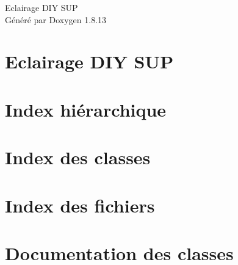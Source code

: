 \documentclass[twoside]{book}
\newcommand{\+}{\discretionary{\mbox{\scriptsize$\hookleftarrow$}}{}{}}
\newcommand{\clearemptydoublepage}{%
  \newpage{\pagestyle{empty}\cleardoublepage}%
}
\begin{document}
\hypersetup{pageanchor=false,
             bookmarksnumbered=true,
             pdfencoding=unicode
            }
\begin{titlepage}
\vspace*{7cm}
\begin{center}%
{\Large Eclairage D\+IY S\+UP }\\
\vspace*{1cm}
{\large Généré par Doxygen 1.8.13}\\
\end{center}
\end{titlepage}
\clearemptydoublepage
{}
\tableofcontents
\clearemptydoublepage
{}
\hypersetup{pageanchor=true}

\chapter{Eclairage D\+IY S\+UP}
\label{index}\hypertarget{index}{}
\chapter{Index hiérarchique}

\chapter{Index des classes}

\chapter{Index des fichiers}

\chapter{Documentation des classes}








































\end{document}
